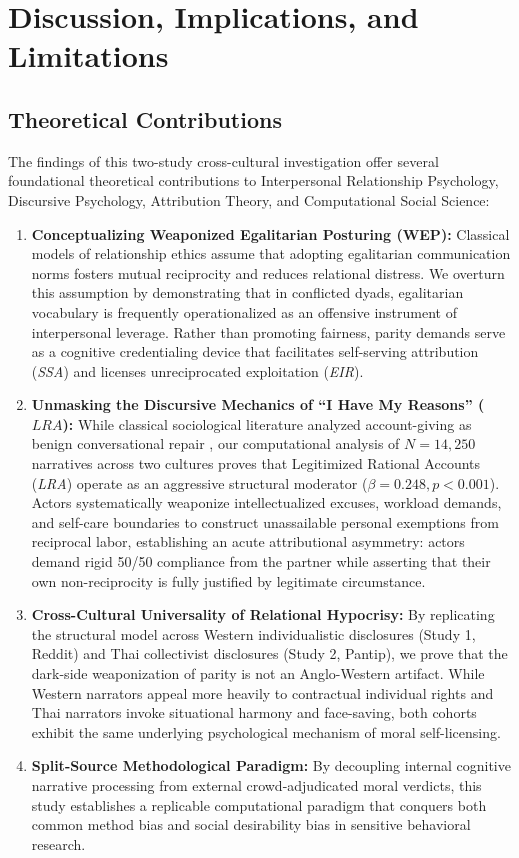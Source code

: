 \section{Discussion, Implications, and Limitations}
\label{sec:discussion}

\subsection{Theoretical Contributions}
The findings of this two-study cross-cultural investigation offer several foundational theoretical contributions to Interpersonal Relationship Psychology, Discursive Psychology, Attribution Theory, and Computational Social Science:
\begin{enumerate}[leftmargin=*]
    \item \textbf{Conceptualizing Weaponized Egalitarian Posturing (WEP):} Classical models of relationship ethics assume that adopting egalitarian communication norms fosters mutual reciprocity and reduces relational distress. We overturn this assumption by demonstrating that in conflicted dyads, egalitarian vocabulary is frequently operationalized as an offensive instrument of interpersonal leverage. Rather than promoting fairness, parity demands serve as a cognitive credentialing device that facilitates self-serving attribution (\textit{SSA}) and licenses unreciprocated exploitation (\textit{EIR}).
    \item \textbf{Unmasking the Discursive Mechanics of ``I Have My Reasons'' ($LRA$):} While classical sociological literature analyzed account-giving as benign conversational repair \citep{scott1968accounts,edwards1992discursive}, our computational analysis of $N = 14,250$ narratives across two cultures proves that Legitimized Rational Accounts (\textit{LRA}) operate as an aggressive structural moderator ($\beta = 0.248, p < 0.001$). Actors systematically weaponize intellectualized excuses, workload demands, and self-care boundaries to construct unassailable personal exemptions from reciprocal labor, establishing an acute attributional asymmetry: actors demand rigid 50/50 compliance from the partner while asserting that their own non-reciprocity is fully justified by legitimate circumstance.
    \item \textbf{Cross-Cultural Universality of Relational Hypocrisy:} By replicating the structural model across Western individualistic disclosures (Study 1, Reddit) and Thai collectivist disclosures (Study 2, Pantip), we prove that the dark-side weaponization of parity is not an Anglo-Western artifact. While Western narrators appeal more heavily to contractual individual rights and Thai narrators invoke situational harmony and face-saving, both cohorts exhibit the same underlying psychological mechanism of moral self-licensing.
    \item \textbf{Split-Source Methodological Paradigm:} By decoupling internal cognitive narrative processing from external crowd-adjudicated moral verdicts, this study establishes a replicable computational paradigm that conquers both common method bias and social desirability bias in sensitive behavioral research.
\end{enumerate}

